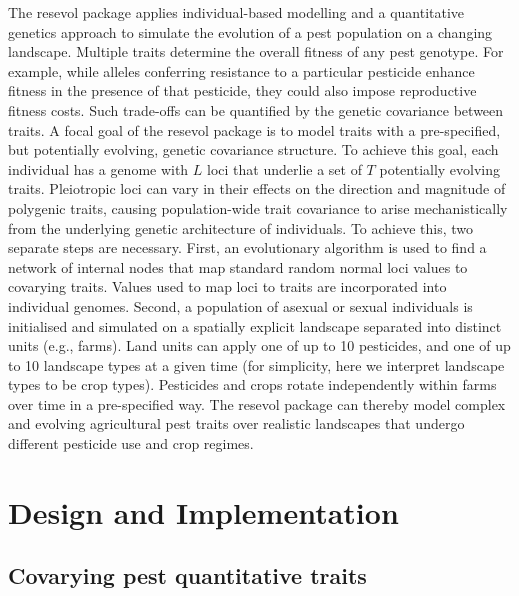\documentclass[
]{article}
\begin{document}
The resevol package applies individual-based modelling and a quantitative genetics approach to simulate the evolution of a pest population on a changing landscape.
Multiple traits determine the overall fitness of any pest genotype.
For example, while alleles conferring resistance to a particular pesticide enhance fitness in the presence of that pesticide, they could also impose reproductive fitness costs.
Such trade-offs can be quantified by the genetic covariance between traits.
A focal goal of the resevol package is to model traits with a pre-specified, but potentially evolving, genetic covariance structure.
To achieve this goal, each individual has a genome with \(L\) loci that underlie a set of \(T\) potentially evolving traits.
Pleiotropic loci can vary in their effects on the direction and magnitude of polygenic traits, causing population-wide trait covariance to arise mechanistically from the underlying genetic architecture of individuals.
To achieve this, two separate steps are necessary.
First, an evolutionary algorithm is used to find a network of internal nodes that map standard random normal loci values to covarying traits.
Values used to map loci to traits are incorporated into individual genomes.
Second, a population of asexual or sexual individuals is initialised and simulated on a spatially explicit landscape separated into distinct units (e.g., farms).
Land units can apply one of up to 10 pesticides, and one of up to 10 landscape types at a given time (for simplicity, here we interpret landscape types to be crop types).
Pesticides and crops rotate independently within farms over time in a pre-specified way.
The resevol package can thereby model complex and evolving agricultural pest traits over realistic landscapes that undergo different pesticide use and crop regimes.

\hypertarget{design-and-implementation}{%
\section{Design and Implementation}\label{design-and-implementation}}

\hypertarget{mine_gmatrix}{%
\subsection{Covarying pest quantitative traits}\label{mine_gmatrix}}
\end{document}
